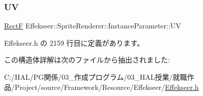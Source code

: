 \subsubsection{\texorpdfstring{UV}{UV}}
{\footnotesize\ttfamily \mbox{\hyperlink{struct_effekseer_1_1_rect_f}{RectF}} Effekseer\+::\+Sprite\+Renderer\+::\+Instance\+Parameter\+::\+UV}



 Effekseer.\+h の 2159 行目に定義があります。



この構造体詳解は次のファイルから抽出されました\+:\begin{DoxyCompactItemize}
\item 
C\+:/\+H\+A\+L/\+P\+G関係/03\+\_\+作成プログラム/03\+\_\+\+H\+A\+L授業/就職作品/\+Project/source/\+Framework/\+Resource/\+Effekseer/\mbox{\hyperlink{_effekseer_8h}{Effekseer.\+h}}\end{DoxyCompactItemize}
